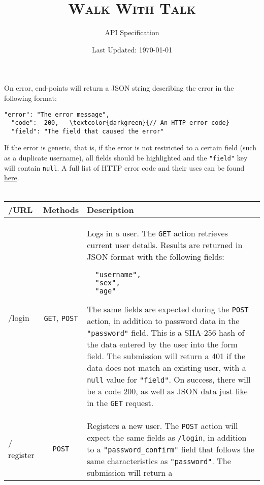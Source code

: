 \documentclass[fleqn,12pt]{article}
\title{\textsc{Walk With Talk}}
\author{API Specification}
\date{Last Updated: \today}
\newcommand{\g}{\texttt{GET}}
\newcommand{\p}{\texttt{POST}}
\renewcommand{\jsnull}{\texttt{null}}
\begin{document}
\maketitle

On error, end-points will return a JSON string describing the error in the
following format:
\begin{Verbatim}[commandchars=\\\{\}]
  "error": "The error message",
  "code":  200,   \textcolor{darkgreen}{// An HTTP error code}
  "field": "The field that caused the error"
\end{Verbatim}
\noindent
If the error is generic, that is, if the error is not restricted to a certain
field (such as a duplicate username), all fields should be highlighted and
the \texttt{"field"} key will contain \jsnull. A full list of HTTP error code
and their uses can be found
\href{https://en.wikipedia.org/wiki/List_of_HTTP_status_codes}{here}.
\\\\
\begin{tabular}{@{} >{\ttfamily/}l |c| p{5in}}
\hline
URL & Methods & Description \\
\hline
login & \g, \p &
Logs in a user. \newline
The \g{} action retrieves current user details. Results are returned in JSON
format with the following fields:
{\begin{verbatim}
  "username",
  "sex",
  "age"
\end{verbatim}}
\newline
The same fields are expected during the \p{} action, in addition to password
data in the \texttt{"password"} field. This is a SHA-256 hash of the data
entered by the user into the form field.
\newline\newline
The submission will return a 401 if the data does not match an existing user,
with a \jsnull{} value for \texttt{"field"}. On success, there will be a code
200, as well as JSON data just like in the \g{} request.
\\
\hline
register & \p &
Registers a new user. \newline
The \p{} action will expect the same fields as \texttt{/login}, in addition to
a \texttt{"password\_confirm"} field that follows the same characteristics as
\texttt{"password"}.
\newline\newline
The submission will return a

\end{tabular}
\end{document}

